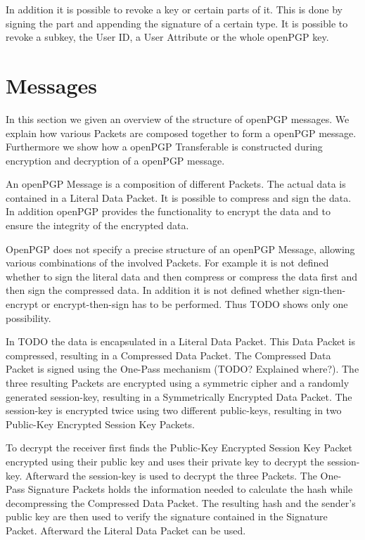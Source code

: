 In addition it is possible to revoke a key or certain parts of it. This is done by signing the part and appending the signature of a certain type. It is possible to revoke a subkey, the User ID, a User Attribute or the whole openPGP key.

\section{Messages}

In this section we given an overview of the structure of openPGP messages. We explain how various Packets are composed together to form a openPGP message. Furthermore we show how a openPGP Transferable is constructed during encryption and decryption of a openPGP message.

An openPGP Message is a composition of different Packets. The actual data is contained in a Literal Data Packet. It is possible to compress and sign the data. In addition openPGP provides the functionality to encrypt the data and to ensure the integrity of the encrypted data.

OpenPGP does not specify a precise structure of an openPGP Message, allowing various combinations of the involved Packets. For example it is not defined whether to sign the literal data and then compress or compress the data first and then sign the compressed data. In addition it is not defined whether sign-then-encrypt or encrypt-then-sign has to be performed.  Thus TODO shows only one possibility.



In TODO the data is encapsulated in a Literal Data Packet. This Data Packet is compressed, resulting in a Compressed Data Packet. The Compressed Data Packet is signed using the One-Pass mechanism (TODO? Explained where?). The three resulting Packets are encrypted using a symmetric cipher and a randomly generated session-key, resulting in a Symmetrically Encrypted Data Packet. The session-key is encrypted twice using two different public-keys, resulting in two Public-Key Encrypted Session Key Packets.


To decrypt the receiver first finds the Public-Key Encrypted Session Key Packet encrypted using their public key and uses their private key to decrypt the session-key. Afterward the session-key is used to decrypt the three Packets. The One-Pass Signature Packets holds the information needed to calculate the hash while decompressing the Compressed Data Packet. The resulting hash and the sender's public key are then used to verify the signature contained in the Signature Packet. Afterward the Literal Data Packet can be used.

